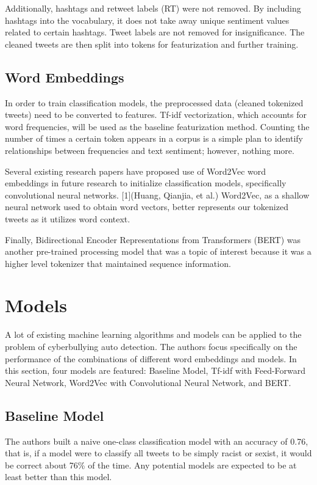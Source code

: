 \documentclass[conference]{IEEEtran}
\begin{document}
Additionally, hashtags and retweet labels (RT) were not removed. By including hashtags into the vocabulary, it does not take away unique sentiment values related to certain hashtags. Tweet labels are not removed for insignificance. The cleaned tweets are then split into tokens for featurization and further training.


\subsection{Word Embeddings}

In order to train classification models, the preprocessed data (cleaned tokenized tweets) need to be converted to features. Tf-idf vectorization, which accounts for word frequencies, will be used as the baseline featurization method. Counting the number of times a certain token appears in a corpus is a simple plan to identify relationships between frequencies and text sentiment; however, nothing more.

	Several existing research papers have proposed use of Word2Vec word embeddings in future research to initialize classification models, specifically convolutional neural networks. [1](Huang, Qianjia, et al.) Word2Vec, as a shallow neural network used to obtain word vectors, better represents our tokenized tweets as it utilizes word context. 

	Finally, Bidirectional Encoder Representations from Transformers (BERT) was another pre-trained processing model that was a topic of interest because it was a higher level tokenizer that maintained sequence information.



\section{Models}
A lot of existing machine learning algorithms and models can be applied to the problem of cyberbullying auto detection. The authors focus specifically on the performance of the combinations of different word embeddings and models. In this section, four models are featured: Baseline Model, Tf-idf with Feed-Forward Neural Network, Word2Vec with Convolutional Neural Network, and BERT.

\subsection{Baseline Model}
The authors built a naive one-class classification model with an accuracy of 0.76, that is, if a model were to classify all tweets to be simply racist or sexist, it would be correct about 76\% of the time. Any potential models are expected to be at least better than this model.
\end{document}
